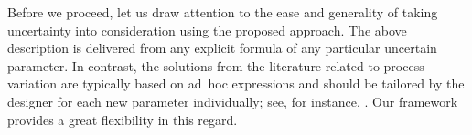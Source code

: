 Before we proceed, let us draw attention to the ease and generality of taking
uncertainty into consideration using the proposed approach. The above
description is delivered from any explicit formula of any particular uncertain
parameter. In contrast, the solutions from the literature related to process
variation are typically based on ad~hoc expressions and should be tailored by
the designer for each new parameter individually; see, for instance,
\cite{ghanta2006, bhardwaj2008, huang2009a}. Our framework provides a great
flexibility in this regard.
